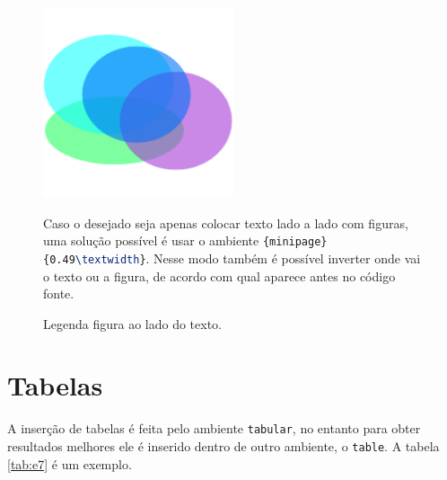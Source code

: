     \begin{figure}[htb]
        \centering
        \begin{minipage}{0.49\textwidth}
            \centering
            \includegraphics[width=0.5\textwidth]{images/figure.pdf}
            \caption{Legenda figura ao lado do texto.}
            \label{fig:texto_do_lado}
        \end{minipage}
        \hfill
        \begin{minipage}{0.49\textwidth}
            \linespread{1.0}\selectfont
            
            Caso o desejado seja apenas colocar texto lado a lado com figuras, uma solução possível é usar o ambiente \lstinline[language=TeX,style=code]|{minipage}{0.49\textwidth}|.
            Nesse modo também é possível inverter onde vai o texto ou a figura, de acordo com qual aparece antes no código fonte.

        \end{minipage}
    \end{figure}


\section{Tabelas}
\label{sec:tabelas}

    A inserção de tabelas é feita pelo ambiente \lstinline[language=TeX, style=Code]|tabular|, no entanto para obter resultados melhores ele é inserido dentro de outro ambiente, o \lstinline[language=TeX, style=Code]|table|.
    A tabela \ref{tab:e7} é um exemplo.


